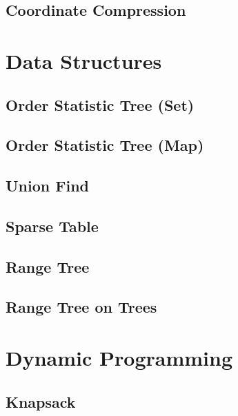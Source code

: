 \documentclass[11pt, letterpaper]{article}
\begin{document}
\subsection{Coordinate Compression}


\section{Data Structures}

\subsection{Order Statistic Tree (Set)}


\subsection{Order Statistic Tree (Map)}


\subsection{Union Find}


\subsection{Sparse Table}


\subsection{Range Tree}


\subsection{Range Tree on Trees}


\section{Dynamic Programming}

\subsection{Knapsack}

\end{document}
